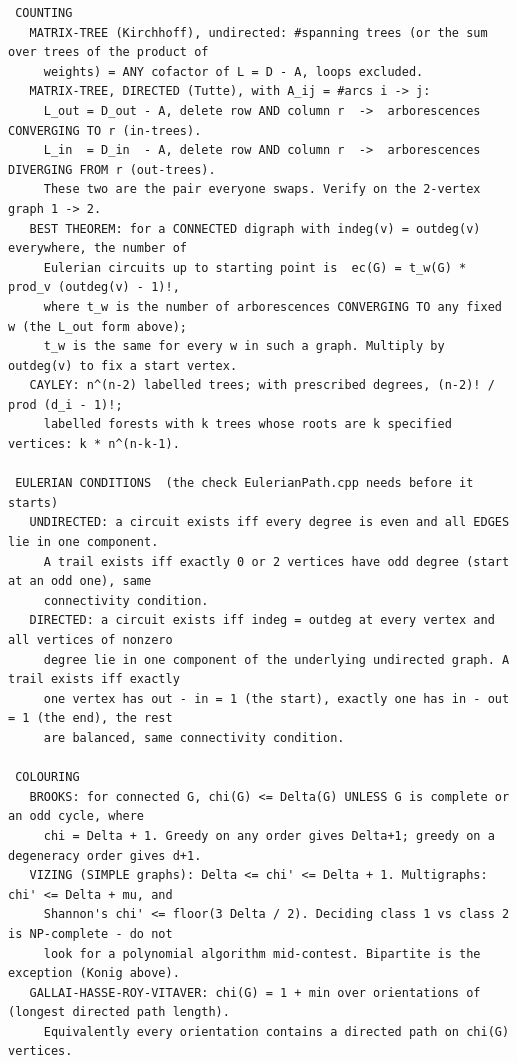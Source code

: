 \documentclass[9pt,a4paper,twocolumn]{extarticle}
\begin{document}
\begin{lstlisting}
 COUNTING
   MATRIX-TREE (Kirchhoff), undirected: #spanning trees (or the sum over trees of the product of
     weights) = ANY cofactor of L = D - A, loops excluded.
   MATRIX-TREE, DIRECTED (Tutte), with A_ij = #arcs i -> j:
     L_out = D_out - A, delete row AND column r  ->  arborescences CONVERGING TO r (in-trees).
     L_in  = D_in  - A, delete row AND column r  ->  arborescences DIVERGING FROM r (out-trees).
     These two are the pair everyone swaps. Verify on the 2-vertex graph 1 -> 2.
   BEST THEOREM: for a CONNECTED digraph with indeg(v) = outdeg(v) everywhere, the number of
     Eulerian circuits up to starting point is  ec(G) = t_w(G) * prod_v (outdeg(v) - 1)!,
     where t_w is the number of arborescences CONVERGING TO any fixed w (the L_out form above);
     t_w is the same for every w in such a graph. Multiply by outdeg(v) to fix a start vertex.
   CAYLEY: n^(n-2) labelled trees; with prescribed degrees, (n-2)! / prod (d_i - 1)!;
     labelled forests with k trees whose roots are k specified vertices: k * n^(n-k-1).

 EULERIAN CONDITIONS  (the check EulerianPath.cpp needs before it starts)
   UNDIRECTED: a circuit exists iff every degree is even and all EDGES lie in one component.
     A trail exists iff exactly 0 or 2 vertices have odd degree (start at an odd one), same
     connectivity condition.
   DIRECTED: a circuit exists iff indeg = outdeg at every vertex and all vertices of nonzero
     degree lie in one component of the underlying undirected graph. A trail exists iff exactly
     one vertex has out - in = 1 (the start), exactly one has in - out = 1 (the end), the rest
     are balanced, same connectivity condition.

 COLOURING
   BROOKS: for connected G, chi(G) <= Delta(G) UNLESS G is complete or an odd cycle, where
     chi = Delta + 1. Greedy on any order gives Delta+1; greedy on a degeneracy order gives d+1.
   VIZING (SIMPLE graphs): Delta <= chi' <= Delta + 1. Multigraphs: chi' <= Delta + mu, and
     Shannon's chi' <= floor(3 Delta / 2). Deciding class 1 vs class 2 is NP-complete - do not
     look for a polynomial algorithm mid-contest. Bipartite is the exception (Konig above).
   GALLAI-HASSE-ROY-VITAVER: chi(G) = 1 + min over orientations of (longest directed path length).
     Equivalently every orientation contains a directed path on chi(G) vertices.


\end{lstlisting}
\end{document}
